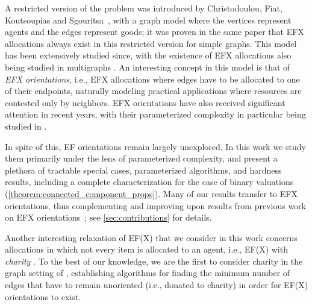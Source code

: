 \documentclass[11pt,letterpaper]{article}
\begin{document}
    A restricted version of the problem was introduced by Christodoulou, Fiat, Koutsoupias and Sgouritsa~\cite{EFXgraphs}, with a graph model where the vertices represent agents and the edges represent goods; it was proven in the same paper that EFX allocations always exist in this restricted version for simple graphs. This model has been extensively studied since, with the existence of EFX allocations also being studied in multigraphs \cite{AfshinmehretTriangleFree,AfshinmehrDKMR25,bhaskar_et_al:LIPIcs.FSTTCS.2025.15_efxallocationsmultigraphclasses,kaviani2024envyfreeallocationindivisiblegoods,OntheExistenceofEFXAllocationsinMultigraphs}. An interesting concept in this model is that of \emph{EFX orientations}, i.e., EFX allocations where edges have to be allocated to one of their endpoints, naturally modeling practical applications where resources are contested only by neighbors. EFX orientations have also received significant attention in recent years, with their parameterized complexity in particular being studied in \cite{AfshinmehrDKMR25,sagt/BlazejGRS25,ijcai/DeligkasEGK25}.

    In spite of this, EF orientations remain largely unexplored.
    In this work we study them primarily under the lens of parameterized complexity, and present a plethora of tractable special cases, parameterized algorithms, and hardness results, including a complete characterization for the case of binary valuations (\cref{theorem:connected_component_props}). Many of our results transfer to EFX orientations, thus complementing and improving upon results from previous work on EFX orientations~\cite{AfshinmehrDKMR25,sagt/BlazejGRS25,ijcai/DeligkasEGK25}; see \cref{sec:contributions} for details.

    Another interesting relaxation of EF(X) that we consider in this work concerns allocations in which not every item is allocated to an agent, i.e., EF(X) with \emph{charity} \cite{CGH19}.
    To the best of our knowledge, we are the first to consider charity in the graph setting of \cite{EFXgraphs}, establishing algorithms for finding the minimum number of edges that have to remain unoriented (i.e., donated to charity) in order for EF(X) orientations to exist.
\end{document}
